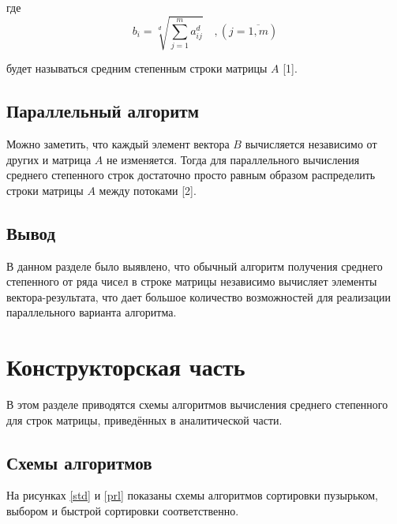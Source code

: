 \documentclass[12pt]{report}
\begin{document}
где
\begin{equation}
	\label{eq:M}
	b_{i} = \sqrt[d]{\sum_{j=1}^{m} a_{ij} ^ d} \quad, (j=\overline{1,m})
\end{equation}

будет называться средним степенным строки матрицы $A$ [1].

\section{Параллельный алгоритм}

Можно заметить, что каждый элемент вектора $B$ вычисляется независимо от других и матрица $A$ не изменяется. Тогда для параллельного вычисления среднего степенного строк достаточно просто равным образом распределить строки матрицы $A$ между потоками [2].

\section{Вывод}

В данном разделе было выявлено, что обычный алгоритм получения среднего степенного от ряда чисел в строке матрицы независимо вычисляет элементы вектора-результата, что дает большое количество возможностей для реализации параллельного варианта алгоритма.

\newpage

\chapter{Конструкторская часть}

В этом разделе приводятся схемы алгоритмов вычисления среднего степенного для строк матрицы, приведённых в аналитической части. 

\section{Схемы алгоритмов}

На рисунках \ref{std} и \ref{prl} показаны схемы алгоритмов сортировки пузырьком, выбором и быстрой сортировки соответственно.
\end{document}
